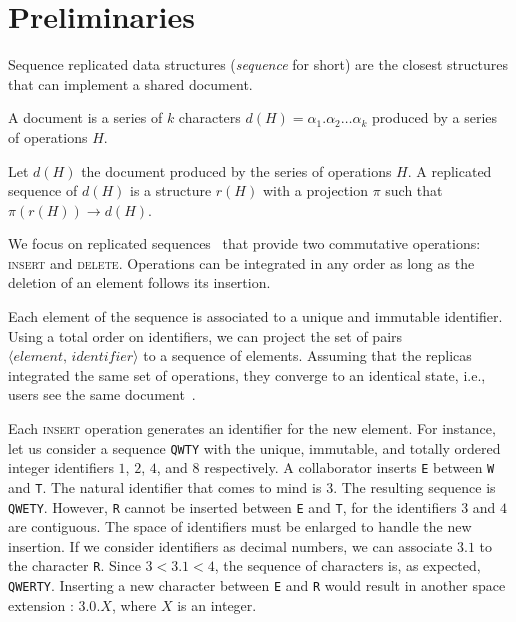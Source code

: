 
\section{Preliminaries}
\label{sec:preliminaries}

Sequence replicated data structures (\emph{sequence} for short) are the closest
structures that can implement a shared document. 

\begin{definition}[Document]
  A document is a series of $k$ characters
  $d(H) = \alpha_1.\alpha_2\ldots \alpha_k$ produced by a series of operations
  $H$.
\end{definition}

\begin{definition}
  Let $d(H)$ the document produced by the series of operations $H$. A replicated
  sequence of $d(H)$ is a structure $r(H)$ with a projection $\pi$ such that
  $\pi(r(H)) \rightarrow d(H)$.
\end{definition}

We focus on replicated sequences~\cite{shapiro2011comprehensive,
  shapiro2011conflict} that provide two commutative operations: \textsc{insert}
and \textsc{delete}. Operations can be integrated in any order as long as the
deletion of an element follows its insertion.

\noindent Each element of the sequence is associated to a unique and immutable
identifier. Using a total order on identifiers, we can project the set of pairs
$\langle element,\, identifier \rangle$ to a sequence of elements. Assuming that
the replicas integrated the same set of operations, they converge to an
identical state, i.e., users see the same document~\cite{shapiro2011conflict}.

Each \textsc{insert} operation generates an identifier for the new element.  For
instance, let us consider a sequence \texttt{QWTY} with the unique, immutable,
and totally ordered integer identifiers $1$, $2$, $4$, and $8$ respectively. A
collaborator inserts \texttt{E} between \texttt{W} and \texttt{T}. The natural
identifier that comes to mind is $3$. The resulting sequence is
\texttt{QWETY}. However, \texttt{R} cannot be inserted between \texttt{E} and
\texttt{T}, for the identifiers $3$ and $4$ are contiguous. The space of
identifiers must be enlarged to handle the new insertion. If we consider
identifiers as decimal numbers, we can associate $3.1$ to the character
\texttt{R}. Since $3 < 3.1 < 4$, the sequence of characters is, as expected,
\texttt{QWERTY}. Inserting a new character between \texttt{E} and \texttt{R}
would result in another space extension : $3.0.X$, where $X$ is an integer.

